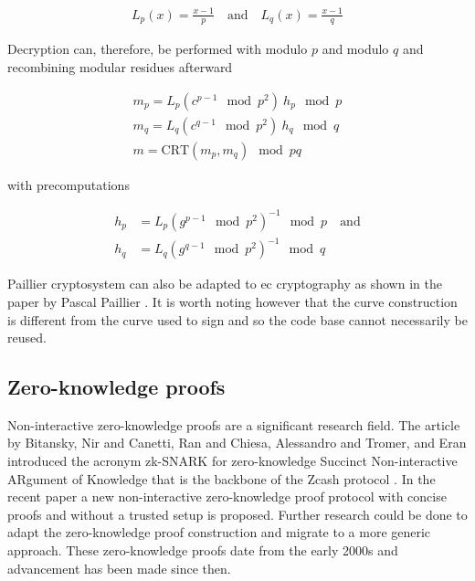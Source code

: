 \begin{ceqn}
\begin{align*}
  L_p(x) = \frac{x-1}{p} \quad \text{and} \quad L_q(x) = \frac{x-1}{q}
\end{align*}
\end{ceqn}

Decryption can, therefore, be performed with modulo $p$ and modulo $q$ and
recombining modular residues afterward

\begin{ceqn}
\begin{align*}
  m_p = L_p(c^{p-1} \mod p^2) \ h_p \mod p \\
  m_q = L_q(c^{q-1} \mod p^2) \ h_q \mod q \\
  m = \text{CRT}(m_p, m_q) \mod pq
\end{align*}
\end{ceqn}

with precomputations

\begin{ceqn}
\begin{align*}
  h_p &= L_p(g^{p-1} \mod p^2)^{-1} \mod p \quad \text{and} \\
  h_q &= L_q(g^{q-1} \mod p^2)^{-1} \mod q
\end{align*}
\end{ceqn}

Paillier cryptosystem can also be adapted to \gls{ec} cryptography as shown in the
paper  by
Pascal Paillier \cite{10.1007/3-540-44448-3_44}. It is worth noting however that
the curve construction is different from the curve used to sign and so the code
base cannot necessarily be reused.

\subsection{Zero-knowledge proofs}

Non-interactive zero-knowledge proofs are a significant research field. The
article  by Bitansky, Nir and Canetti, Ran and
Chiesa, Alessandro and Tromer, and Eran \cite{Bitansky:2012:ECR:2090236.2090263}
introduced the acronym zk-SNARK for zero-knowledge Succinct Non-interactive
ARgument of Knowledge that is the backbone of the Zcash protocol
\cite{cryptoeprint:2014:349}. In the recent paper  \cite{cryptoeprint:2017:1066} a new
non-interactive zero-knowledge proof protocol with concise proofs and without a
trusted setup is proposed. Further research could be done to adapt the
zero-knowledge proof construction and migrate to a more generic approach. These
zero-knowledge proofs date from the early 2000s and advancement has been made
since then.

